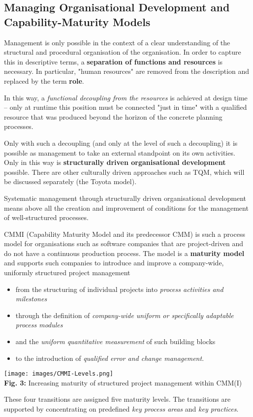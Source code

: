 \documentclass[11pt,a4paper]{article}
\begin{document}
\subsection{Managing Organisational Development and\\ Capability-Maturity
  Models} 

Management is only possible in the context of a clear understanding of the
structural and procedural organisation of the organisation.  In order to
capture this in descriptive terms, a \textbf{separation of functions and
  resources} is necessary. In particular, "human resources" are removed from
the description and replaced by the term \textbf{role}.

In this way, a \emph{functional decoupling from the resources} is achieved at
design time -- only at runtime this position must be connected "just in time"
with a qualified resource that was produced beyond the horizon of the concrete
planning processes.

Only with such a decoupling (and only at the level of such a decoupling) it is
possible as management to take an external standpoint on its own activities.
Only in this way is \textbf{structurally driven organisational development}
possible. There are other culturally driven approaches such as TQM, which will
be discussed separately (the Toyota model).

Systematic management through structurally driven organisational development
means above all the creation and improvement of conditions for the management
of well-structured processes.

CMMI (Capability Maturity Model and its predecessor CMM) is such a process
model for organisations such as software companies that are project-driven and
do not have a continuous production process. The model is a \textbf{maturity
  model} and supports such companies to introduce and improve a company-wide,
uniformly structured project management
\begin{itemize} 
\item from the structuring of individual projects into \emph{process
  activities and milestones}
\item through the definition of \emph{company-wide uniform or specifically
  adaptable process modules}
\item and the \emph{uniform quantitative measurement} of such building blocks
\item to the introduction of \emph{qualified error and change management}.
\end{itemize}
\begin{center}
  \texttt{[image: images/CMMI-Levels.png]}\\
  \textbf{Fig. 3:} Increasing maturity of structured project management within
  CMM(I)
\end{center}
These four transitions are assigned five maturity levels. The transitions are
supported by concentrating on predefined \emph{key process areas} and
\emph{key practices}.
\end{document}
